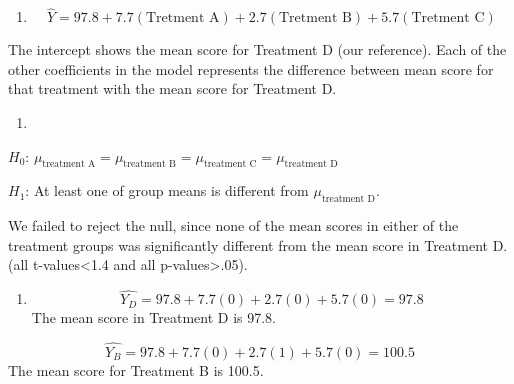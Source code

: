 \documentclass[]{article}
\providecommand{\tightlist}{%
  \setlength{\itemsep}{0pt}\setlength{\parskip}{0pt}}
\begin{document}
\begin{enumerate}
\def\labelenumi{\arabic{enumi}.}
\tightlist
\item
  \[\hat{Y} = 97.8 + 7.7(\text{Tretment A}) + 2.7(\text{Tretment B}) + 5.7(\text{Tretment C})\]
\end{enumerate}

The intercept shows the mean score for Treatment D (our reference). Each
of the other coefficients in the model represents the difference between
mean score for that treatment with the mean score for Treatment D.

\begin{enumerate}
\def\labelenumi{\arabic{enumi}.}
\setcounter{enumi}{1}
\item
\end{enumerate}

\(H_0\):
\(\mu_\text{treatment A} = \mu_\text{treatment B} =\mu_\text{treatment C} =\mu_\text{treatment D}\)

\(H_1\): At least one of group means is different from
\(\mu_\text{treatment D}\).

We failed to reject the null, since none of the mean scores in either of
the treatment groups was significantly different from the mean score in
Treatment D. (all t-values\textless{}1.4 and all
p-values\textgreater{}.05).

\begin{enumerate}
\def\labelenumi{\arabic{enumi}.}
\setcounter{enumi}{2}
\tightlist
\item
  \[\hat{Y_D} = 97.8 + 7.7(0) + 2.7(0) + 5.7(0) = 97.8\] The mean score
  in Treatment D is 97.8.
\end{enumerate}

\[\hat{Y_B} = 97.8 + 7.7(0) + 2.7(1) + 5.7(0) = 100.5\] The mean score
for Treatment B is 100.5.
\end{document}
